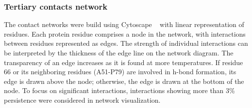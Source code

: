 \documentclass[10pt,letterpaper]{article}
\begin{document}
\subsubsection*{Tertiary contacts network} The contact networks were build using Cytoscape ~\cite {Ahlstrom2013} with linear representation of residues.  Each protein residue comprises a node in the network, with interactions between residues represented as edges. The strength of individual interactions can be interpreted by the  thickness of the edge line on the network diagram. The transparency of an edge increases as it is found at more temperatures.  If residue  66 or its neighboring residues (A51-P79) are involved in h-bond formation, its edge is drawn above the node; otherwise, the edge is drawn at the bottom of the node. To focus on significant interactions, interactions showing more than 3\% persistence were considered in network visualization.      


\end{document}
